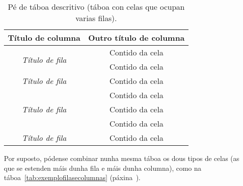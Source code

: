 \begin{table}[hp!]
  \centering
  \begin{tabular}{c|c}
  \rowcolor{udcpink!25}
  \textbf{Título de columna} & \textbf{Outro título de columna} \\\hline
  \multirow{2}{*}{\textit{Título de fila}} & \cellcolor{udcgray!25} Contido da cela \\
                                           & Contido da cela \\
  \rowcolor{udcgray!25}
  \textit{Título de fila}                  & Contido da cela \\
  \multirow{3}{*}{\textit{Título de fila}} & Contido da cela \\
                                           & \cellcolor{udcgray!25} Contido da cela \\
                                           & Contido da cela \\
  \rowcolor{udcgray!25}
  \textit{Título de fila}                  & Contido da cela \\
  \end{tabular}
  \caption{Pé de táboa descritivo (táboa con celas que ocupan varias filas).}
  \label{tab:exemplofilas}
\end{table}

Por suposto, pódense combinar nunha mesma táboa os dous tipos de celas (as que se 
estenden máis dunha fila e máis dunha columna), como na táboa~\ref{tab:exemplofilasecolumnas}
(páxina~\pageref{tab:exemplofilasecolumnas}).

